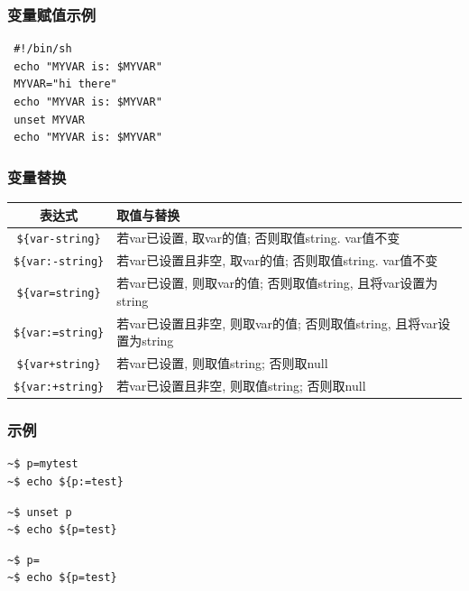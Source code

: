 \documentclass[compress]{beamer}
\begin{document}
\begin{frame}[fragile]
  \frametitle{变量赋值示例}

\begin{lstlisting}
 #!/bin/sh
 echo "MYVAR is: $MYVAR"
 MYVAR="hi there"
 echo "MYVAR is: $MYVAR"
 unset MYVAR
 echo "MYVAR is: $MYVAR"
\end{lstlisting}

\end{frame}

\begin{frame}[fragile]
\frametitle{变量替换}
{\small
\begin{tabular}{|c|p{7cm}|} \hline
表达式 & 取值与替换 \\ \hline \hline

\verb=${var-string}= & 若var已设置, 取var的值; 否则取值string.
var值不变
\\ \hline

\verb=${var:-string}= & 若var已设置且非空, 取var的值;
否则取值string. var值不变 \\ \hline

\verb~${var=string}~ & 若var已设置, 则取var的值; 否则取值string,
且将var设置为string \\ \hline

\verb~${var:=string}~ & 若var已设置且非空, 则取var的值;
否则取值string, 且将var设置为string \\ \hline

\verb~${var+string}~ & 若var已设置, 则取值string; 否则取null \\
\hline

\verb~${var:+string}~ & 若var已设置且非空, 则取值string;
否则取null \\ \hline
\end{tabular}
}


\end{frame}

\begin{frame}[fragile]
  \frametitle{示例}

\begin{Verbatim}
~$ p=mytest
~$ echo ${p:=test}
\end{Verbatim}

\begin{Verbatim}
~$ unset p
~$ echo ${p=test}
\end{Verbatim}

\begin{Verbatim}
~$ p= 
~$ echo ${p=test}
\end{Verbatim}

\end{frame}
\end{document}
